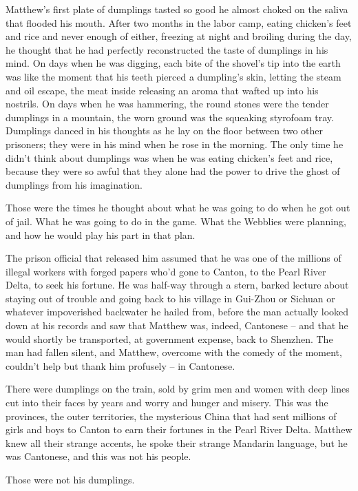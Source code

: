 Matthew's first plate of dumplings tasted so good he almost choked
on the saliva that flooded his mouth. After two months in the labor
camp, eating chicken's feet and rice and never enough of either,
freezing at night and broiling during the day, he thought that he
had perfectly reconstructed the taste of dumplings in his mind. On
days when he was digging, each bite of the shovel's tip into the
earth was like the moment that his teeth pierced a dumpling's skin,
letting the steam and oil escape, the meat inside releasing an
aroma that wafted up into his nostrils. On days when he was
hammering, the round stones were the tender dumplings in a
mountain, the worn ground was the squeaking styrofoam tray.
Dumplings danced in his thoughts as he lay on the floor between two
other prisoners; they were in his mind when he rose in the morning.
The only time he didn't think about dumplings was when he was
eating chicken's feet and rice, because they were so awful that
they alone had the power to drive the ghost of dumplings from his
imagination.

Those were the times he thought about what he was going to do when
he got out of jail. What he was going to do in the game. What the
Webblies were planning, and how he would play his part in that
plan.

The prison official that released him assumed that he was one of
the millions of illegal workers with forged papers who'd gone to
Canton, to the Pearl River Delta, to seek his fortune. He was
half-way through a stern, barked lecture about staying out of
trouble and going back to his village in Gui-Zhou or Sichuan or
whatever impoverished backwater he hailed from, before the man
actually looked down at his records and saw that Matthew was,
indeed, Cantonese -- and that he would shortly be transported, at
government expense, back to Shenzhen. The man had fallen silent,
and Matthew, overcome with the comedy of the moment, couldn't help
but thank him profusely -- in Cantonese.

There were dumplings on the train, sold by grim men and women with
deep lines cut into their faces by years and worry and hunger and
misery. This was the provinces, the outer territories, the
mysterious China that had sent millions of girls and boys to Canton
to earn their fortunes in the Pearl River Delta. Matthew knew all
their strange accents, he spoke their strange Mandarin language,
but he was Cantonese, and this was not his people.

Those were not his dumplings.

